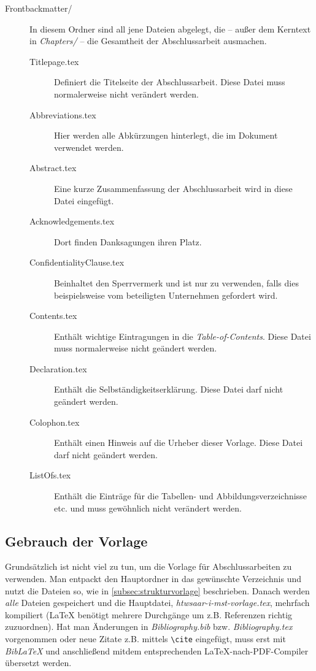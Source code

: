 \begin{description}
 \item [Frontbackmatter/]
 In diesem Ordner sind all jene Dateien abgelegt, die -- außer dem Kerntext in \textit{Chapters/} -- die Gesamtheit der Abschlussarbeit ausmachen.
      \begin{description}
       \item [Titlepage.tex] Definiert die Titelseite der Abschlussarbeit. Diese Datei muss normalerweise nicht verändert werden.
       \item [Abbreviations.tex] Hier werden alle Abkürzungen hinterlegt, die im Dokument verwendet werden.
       \item [Abstract.tex] Eine kurze Zusammenfassung der Abschlussarbeit wird in diese Datei eingefügt.
       \item [Acknowledgements.tex] Dort finden Danksagungen ihren Platz.
       \item [ConfidentialityClause.tex] Beinhaltet den Sperrvermerk und ist nur zu verwenden, falls dies beispielsweise vom beteiligten Unternehmen gefordert wird.
       \item [Contents.tex] Enthält wichtige Eintragungen in die \textit{Table-of-Contents}. Diese Datei muss normalerweise nicht geändert werden.
       \item [Declaration.tex] Enthält die Selbständigkeitserklärung. Diese Datei darf nicht geändert werden.
       \item [Colophon.tex] Enthält einen Hinweis auf die Urheber dieser Vorlage. Diese Datei darf nicht geändert werden.
       \item [ListOfs.tex] Enthält die Einträge für die Tabellen- und Abbildungsverzeichnisse etc. und muss gewöhnlich nicht verändert werden.
      \end{description}

\end{description}


\subsection{Gebrauch der Vorlage}

Grundsätzlich ist nicht viel zu tun, um die Vorlage für Abschlussarbeiten zu verwenden. Man entpackt den Hauptordner in das gewünschte Verzeichnis und nutzt die Dateien so, wie in
\autoref{subsec:strukturvorlage} beschrieben. Danach werden \textit{alle} Dateien gespeichert und die Hauptdatei, \textit{htwsaar-i-mst-vorlage.tex}, mehrfach kompiliert
(LaTeX benötigt mehrere Durchgänge um z.B. Referenzen richtig zuzuordnen).
Hat man Änderungen in \textit{Bibliography.bib} bzw. \textit{Bibliography.tex} vorgenommen oder neue Zitate z.B. mittels \lstinline{\cite} eingefügt, muss erst mit 
\textit{BibLaTeX} und anschließend mitdem entsprechenden LaTeX-nach-PDF-Compiler übersetzt werden.


